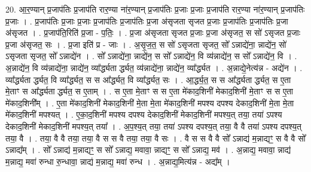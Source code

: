\documentclass[17pt]{extarticle}
\begin{document}
20. आ॒र॒ण्यान् प्र॒जाप॑तिः प्र॒जाप॑ति रार॒ण्या ना॑र॒ण्यान् प्र॒जाप॑तिः प्र॒जाः प्र॒जाः प्र॒जाप॑ति रार॒ण्या ना॑र॒ण्यान् प्र॒जाप॑तिः प्र॒जाः । . प्र॒जाप॑तिः प्र॒जाः प्र॒जाः प्र॒जाप॑तिः प्र॒जाप॑तिः प्र॒जा अ॑सृजता सृजत प्र॒जाः प्र॒जाप॑तिः प्र॒जाप॑तिः प्र॒जा अ॑सृजत । . प्र॒जाप॑ति॒रिति॑ प्र॒जा - प॒तिः॒ । . प्र॒जा अ॑सृजता सृजत प्र॒जाः प्र॒जा अ॑सृजत॒ स सो॑ ऽसृजत प्र॒जाः प्र॒जा अ॑सृजत॒ सः । . प्र॒जा इति॑ प्र - जाः । . अ॒सृ॒ज॒त॒ स सो॑ ऽसृजता सृजत॒ सो᳚ ऽन्नाद्ये॑ना॒ न्नाद्ये॑न॒ सो॑ ऽसृजता सृजत॒ सो᳚ ऽन्नाद्ये॑न । . सो᳚ ऽन्नाद्ये॑ना॒ न्नाद्ये॑न॒ स सो᳚ ऽन्नाद्ये॑न॒ वि व्य॑न्नाद्ये॑न॒ स सो᳚ ऽन्नाद्ये॑न॒ वि । . अ॒न्नाद्ये॑न॒ वि व्य॑न्नाद्ये॑ना॒ न्नाद्ये॑न॒ व्या᳚र्द्ध्यता र्द्ध्यत॒ व्य॑न्नाद्ये॑ना॒ न्नाद्ये॑न॒ व्या᳚र्द्ध्यत । . अ॒न्नाद्ये॒नेत्य॑न्न - अद्ये॑न । . व्या᳚र्द्ध्यता र्द्ध्यत॒ वि व्या᳚र्द्ध्यत॒ स स आ᳚र्द्ध्यत॒ वि व्या᳚र्द्ध्यत॒ सः । . आ॒र्द्ध्य॒त॒ स स आ᳚र्द्ध्यता र्द्ध्यत॒ स ए॒ता मे॒ताꣳ स आ᳚र्द्ध्यता र्द्ध्यत॒ स ए॒ताम् । . स ए॒ता मे॒ताꣳ स स ए॒ता मे॑काद॒शिनी॑ मेकाद॒शिनी॑ मे॒ताꣳ स स ए॒ता मे॑काद॒शिनी᳚म् । . ए॒ता मे॑काद॒शिनी॑ मेकाद॒शिनी॑ मे॒ता मे॒ता मे॑काद॒शिनी॑ मपश्य दपश्य देकाद॒शिनी॑ मे॒ता मे॒ता मे॑काद॒शिनी॑ मपश्यत् । . ए॒का॒द॒शिनी॑ मपश्य दपश्य देकाद॒शिनी॑ मेकाद॒शिनी॑ मपश्य॒त् तया॒ तया॑ ऽपश्य देकाद॒शिनी॑ मेकाद॒शिनी॑ मपश्य॒त् तया᳚ । . अ॒प॒श्य॒त् तया॒ तया॑ ऽपश्य दपश्य॒त् तया॒ वै वै तया॑ ऽपश्य दपश्य॒त् तया॒ वै । . तया॒ वै वै तया॒ तया॒ वै स स वै तया॒ तया॒ वै सः । . वै स स वै वै सो᳚ ऽन्नाद्य॑ म॒न्नाद्यꣳ॒॒ स वै वै सो᳚ ऽन्नाद्य᳚म् । . सो᳚ ऽन्नाद्य॑ म॒न्नाद्यꣳ॒॒ स सो᳚ ऽन्नाद्य॒ मवावा॒ न्नाद्यꣳ॒॒ स सो᳚ ऽन्नाद्य॒ मव॑ । . अ॒न्नाद्य॒ मवावा॒ न्नाद्य॑ म॒न्नाद्य॒ मवा॑ रुन्धा रु॒न्धावा॒ न्नाद्य॑ म॒न्नाद्य॒ मवा॑ रुन्ध । . अ॒न्नाद्य॒मित्य॑न्न - अद्य᳚म् । \newline
\end{document}
